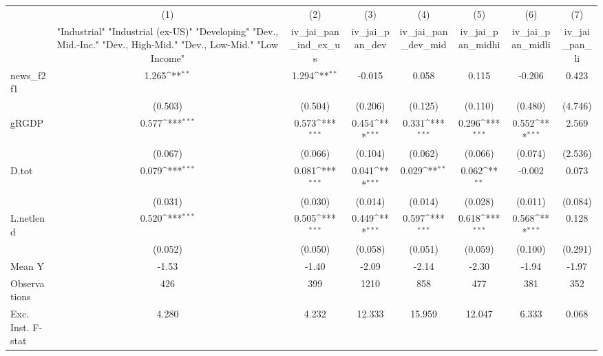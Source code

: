 {
\def\sym#1{\ifmmode^{#1}\else\(^{#1}\)\fi}
\begin{tabular}{l*{7}{c}}
\toprule
            &\multicolumn{1}{c}{(1)}&\multicolumn{1}{c}{(2)}&\multicolumn{1}{c}{(3)}&\multicolumn{1}{c}{(4)}&\multicolumn{1}{c}{(5)}&\multicolumn{1}{c}{(6)}&\multicolumn{1}{c}{(7)}\\
            &\multicolumn{1}{c}{ "Industrial" "Industrial (ex-US)" "Developing" "Dev., Mid.-Inc." "Dev., High-Mid."  "Dev., Low-Mid." "Low Income" }&\multicolumn{1}{c}{iv\_jai\_pan\_ind\_ex\_us}&\multicolumn{1}{c}{iv\_jai\_pan\_dev}&\multicolumn{1}{c}{iv\_jai\_pan\_dev\_mid}&\multicolumn{1}{c}{iv\_jai\_pan\_midhi}&\multicolumn{1}{c}{iv\_jai\_pan\_midli}&\multicolumn{1}{c}{iv\_jai\_pan\_li}\\
\midrule
news\_f2f1   &       1.265\sym{**} &       1.294\sym{**} &      -0.015         &       0.058         &       0.115         &      -0.206         &       0.423         \\
            &     (0.503)         &     (0.504)         &     (0.206)         &     (0.125)         &     (0.110)         &     (0.480)         &     (4.746)         \\
\addlinespace
gRGDP       &       0.577\sym{***}&       0.573\sym{***}&       0.454\sym{***}&       0.331\sym{***}&       0.296\sym{***}&       0.552\sym{***}&       2.569         \\
            &     (0.067)         &     (0.066)         &     (0.104)         &     (0.062)         &     (0.066)         &     (0.074)         &     (2.536)         \\
\addlinespace
D.tot       &       0.079\sym{***}&       0.081\sym{***}&       0.041\sym{***}&       0.029\sym{**} &       0.062\sym{**} &      -0.002         &       0.073         \\
            &     (0.031)         &     (0.030)         &     (0.014)         &     (0.014)         &     (0.028)         &     (0.011)         &     (0.084)         \\
\addlinespace
L.netlend   &       0.520\sym{***}&       0.505\sym{***}&       0.449\sym{***}&       0.597\sym{***}&       0.618\sym{***}&       0.568\sym{***}&       0.128         \\
            &     (0.052)         &     (0.050)         &     (0.058)         &     (0.051)         &     (0.059)         &     (0.100)         &     (0.291)         \\
\midrule
Mean Y      &       -1.53         &       -1.40         &       -2.09         &       -2.14         &       -2.30         &       -1.94         &       -1.97         \\
Observations&         426         &         399         &        1210         &         858         &         477         &         381         &         352         \\
Exc. Inst. F-stat&       4.280         &       4.232         &      12.333         &      15.959         &      12.047         &       6.333         &       0.068         \\
\bottomrule
\end{tabular}
}
